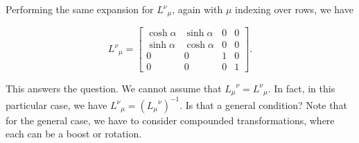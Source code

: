 Performing the same expansion for ${L^\nu}_\mu$, again with $\mu$ indexing over rows, we have

\begin{equation}\label{eqn:antisymmetricTensorTx:470}
{L^\nu}_\mu =
\begin{bmatrix}
\cosh \alpha & \sinh \alpha & 0 & 0 \\
\sinh \alpha & \cosh \alpha & 0 & 0 \\
0 & 0 & 1 & 0 \\
0 & 0 & 0 & 1
\end{bmatrix}.
\end{equation}

This answers the question.  We cannot assume that ${L_\mu}^\nu = {L^\nu}_\mu$.  In fact, in this particular case, we have ${L^\nu}_\mu = ({L_\mu}^\nu)^{-1}$.  Is that a general condition?  Note that for the general case, we have to consider compounded transformations, where each can be a boost or rotation.

\EndArticle
